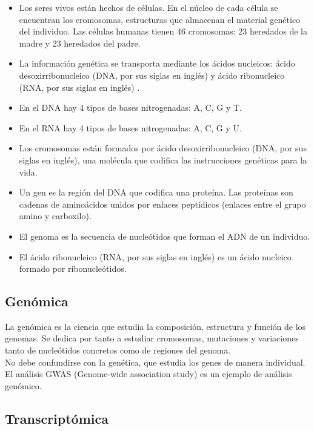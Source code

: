 \begin{itemize}
	\item Los seres vivos están hechos de células. En el núcleo de cada célula se encuentran los cromosomas, estructuras que almacenan el material genético del individuo. Las células humanas tienen 46 cromosomas: 23 heredados de la madre y 23 heredados del padre.
	\item La información genética se transporta mediante los ácidos nucleicos: ácido desoxirribonucleico (DNA, por sus siglas en inglés) y ácido ribonucleico (RNA, por sus siglas en inglés) \cite{Pierce2010}.
	\item En el DNA hay 4 tipos de bases nitrogenadas: A, C, G y T.
	\item En el RNA hay 4 tipos de bases nitrogenadas: A, C, G y U.
	\item Los cromosomas están formados por ácido desoxirribonucleico (DNA, por sus siglas en inglés), una molécula que codifica las instrucciones genéticas para la vida.
	\item Un gen es la región del DNA que codifica una proteína. Las proteínas son cadenas de aminoácidos unidos por enlaces peptídicos (enlaces entre el grupo amino y carboxilo).
	\item El genoma es la secuencia de nucleótidos que forman el ADN de un individuo.
	\item El ácido ribonucleico (RNA, por sus siglas en inglés) es un ácido nucleico formado por ribonucleótidos. 
\end{itemize}

\subsection{Genómica}

La genómica es la ciencia que estudia la composición, estructura y función de los genomas. Se dedica por tanto a estudiar cromosomas, mutaciones y variaciones tanto de nucleótidos concretos como de regiones del genoma.\\

No debe confundirse con la genética, que estudia los genes de manera individual.\\

El análisis GWAS (Genome-wide association study) es un ejemplo de análisis genómico.

\subsection{Transcriptómica}

